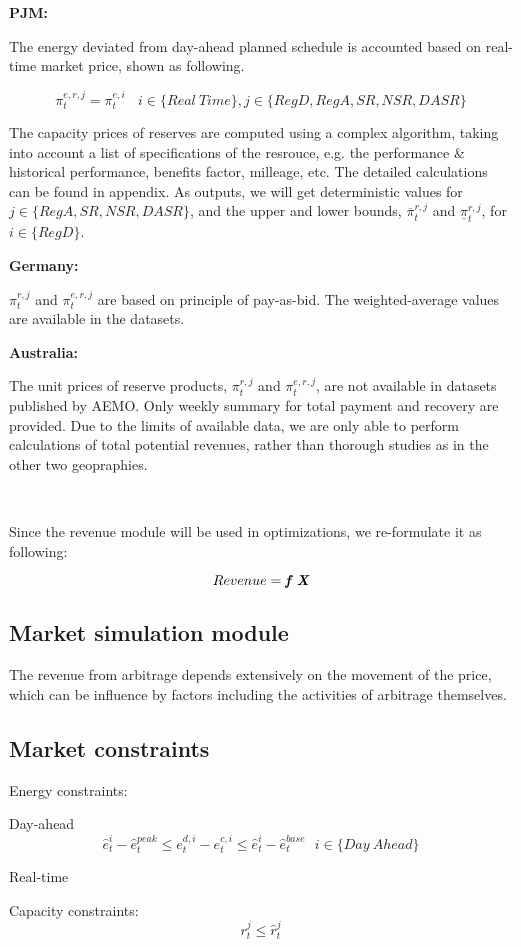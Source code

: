 \textbf{PJM:}

The energy deviated from day-ahead planned schedule is accounted based on real-time market price, shown as following.

\begin{equation*}
\pi_t^{e,r,j} = \pi_t^{e,i} ~~~~ i \in \{Real~Time\}, j \in \{RegD, RegA, SR, NSR, DASR\}
\end{equation*}

The capacity prices of reserves are computed using a complex algorithm, taking into account a list of specifications of the resrouce, e.g. the performance \& historical performance, benefits factor, milleage, etc. The detailed calculations can be found in appendix. As outputs, we will get deterministic values for $j \in \{RegA, SR, NSR, DASR\}$, and the upper and lower bounds, $\overline{\pi}_t^{r,j}$ and $\underline{\pi}_t^{r,j}$, for $i \in \{RegD\}$.

\textbf{Germany:}

$\pi_t^{r,j}$ and $\pi_t^{e,r,j}$ are based on principle of pay-as-bid. The weighted-average values are available in the datasets.

\textbf{Australia:}

The unit prices of reserve products, $\pi_t^{r,j}$ and $\pi_t^{e,r,j}$, are not available in datasets published by AEMO. Only weekly summary for total payment and recovery are provided. Due to the limits of available data, we are only able to perform calculations of total potential revenues, rather than thorough studies as in the other two geopraphies.

~\newline

Since the revenue module will be used in optimizations, we re-formulate it as following:

\begin{equation*}
Revenue = \textit{\textbf{f X}}
\end{equation*}



\subsection{Market simulation module}

The revenue from arbitrage depends extensively on the movement of the price, which can be influence by factors including the activities of arbitrage themselves. 



\subsection{Market constraints}

Energy constraints:

Day-ahead
\begin{equation}
\hat{e}_t^i - \hat{e}_t^{peak} \leq e_t^{d,i} - e_t^{c,i} \leq \hat{e}_t^i - \hat{e}_t^{base} ~~~ i \in \{Day~Ahead\}
\end{equation}

Real-time



Capacity constraints:
\begin{equation}
r_t^j \leq \hat{r}_t^j
\end{equation}